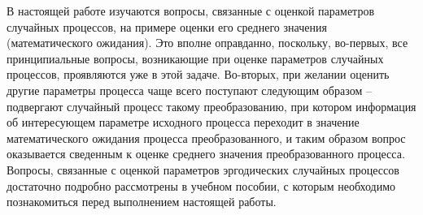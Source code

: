 

\def\labauthors{Виноградов И.Д., Карусевич А.А., Понур К.А., Шиков А.П.}
\def\labgroup{440}
\def\labnumber{1}
\def\labtheme{Оценивание параметров случайного процесса}
\def\department{Кафедра статистической радиофизики}
\newcommand{\D}[1]{D\qty[#1]}

\newpage
В настоящей работе изучаются вопросы, связанные с оценкой параметров случайных процессов, на примере оценки его среднего значения (математического ожидания). Это вполне оправданно, поскольку, во-первых, все принципиальные вопросы, возникающие при оценке параметров случайных процессов, проявляются уже в этой задаче. Во-вторых, при желании оценить другие параметры процесса чаще всего поступают следующим образом – подвергают случайный процесс такому преобразованию, при котором информация об интересующем параметре исходного процесса переходит в значение математического ожидания процесса преобразованного, и таким образом вопрос оказывается сведенным к оценке среднего значения преобразованного процесса.
Вопросы, связанные с оценкой параметров эргодических случайных процессов достаточно подробно рассмотрены в учебном пособии, с которым необходимо познакомиться перед выполнением настоящей работы.

